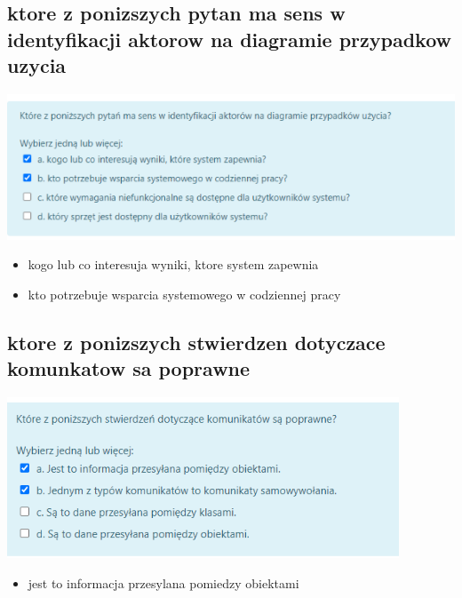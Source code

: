 \documentclass[11pt]{article}
\begin{document}
\subsection{ktore z ponizszych pytan ma sens w identyfikacji aktorow na diagramie przypadkow uzycia}
\label{sec:orgf3f845d}
\begin{center}
\includegraphics[width=.9\linewidth]{./zadanie14.png}
\end{center}
\begin{itemize}
\item kogo lub co interesuja wyniki, ktore system zapewnia
\item kto potrzebuje wsparcia systemowego w codziennej pracy
\end{itemize}
\subsection{ktore z ponizszych stwierdzen dotyczace komunkatow sa poprawne}
\label{sec:org5f2a825}
\begin{center}
\includegraphics[width=.9\linewidth]{./zadanie15.png}
\end{center}
\begin{itemize}
\item jest to informacja przesylana pomiedzy obiektami
\end{itemize}
\end{document}
